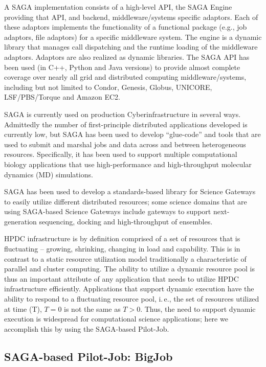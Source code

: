 \documentclass{sig-alternate}
\begin{document}
A SAGA implementation consists of a high-level API, the SAGA
Engine providing that API, and backend, middleware/systems specific
adaptors. Each of these adaptors implements the functionality of
a functional package (e.g., job adaptors, file adaptors) for a
specific middleware system. The engine is a dynamic library that
manages call dispatching and the runtime loading of the middleware
adaptors. Adaptors are also realized as dynamic libraries. The SAGA
API has been used (in C++, Python and Java versions) to provide almost
complete coverage over nearly all grid and distributed computing
middleware/systems, including but not limited to Condor, Genesis,
Globus, UNICORE, LSF/PBS/Torque and Amazon EC2.

SAGA is currently used on production Cyberinfrastructure in several
ways. Admittedly the number of first-principle distributed
applications developed is currently low, but SAGA has been used to develop
``glue-code'' and tools that are used to submit and marshal jobs and
data across and between heterogeneous resources. Specifically, it has
been used to support multiple computational biology applications that
use high-performance and high-throughput molecular dynamics (MD)
simulations.

SAGA has been used to develop a standards-based library for Science
Gateways to easily utilize different distributed resources; some
science domains that are using SAGA-based Science Gateways include
gateways to support next-generation sequencing, docking and
high-throughput of ensembles.

HPDC infrastructure is by definition comprised of a set of resources
that is fluctuating -- growing, shrinking, changing in load and
capability. This is in contrast to a static resource utilization model
traditionally a characteristic of parallel and cluster computing. The
ability to utilize a dynamic resource pool is thus an important
attribute of any application that needs to utilize HPDC infrastructure
efficiently. Applications that support dynamic execution have the
ability to respond to a fluctuating resource pool, i.\,e., the set of
resources utilized at time (T), $T=0$ is not the same as $T>0$.  Thus,
the need to support dynamic execution is widespread for computational
science applications; here we accomplish this by using the SAGA-based
Pilot-Job.

\subsection{SAGA-based Pilot-Job: BigJob}
\end{document}
